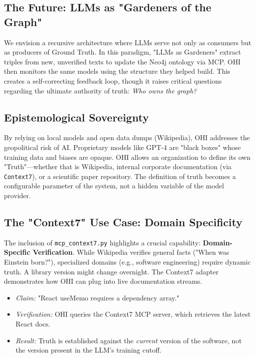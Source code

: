 \documentclass[10pt, a4paper, twocolumn]{article}
\begin{document}
\subsection{The Future: LLMs as "Gardeners of the Graph"}
We envision a recursive architecture where LLMs serve not only as consumers but as producers of Ground Truth. In this paradigm, "LLMs as Gardeners" extract triples from new, unverified texts to update the Neo4j ontology via MCP. OHI then monitors the same models using the structure they helped build. This creates a self-correcting feedback loop, though it raises critical questions regarding the ultimate authority of truth: \textit{Who owns the graph?}

\subsection{Epistemological Sovereignty}
By relying on local models and open data dumps (Wikipedia), OHI addresses the geopolitical risk of AI. Proprietary models like GPT-4 are "black boxes" whose training data and biases are opaque. OHI allows an organization to define its own "Truth"—whether that is Wikipedia, internal corporate documentation (via \texttt{Context7}), or a scientific paper repository. The definition of truth becomes a configurable parameter of the system, not a hidden variable of the model provider.

\subsection{The "Context7" Use Case: Domain Specificity}
The inclusion of \texttt{mcp\_context7.py} highlights a crucial capability: \textbf{Domain-Specific Verification}.
While Wikipedia verifies general facts ("When was Einstein born?"), specialized domains (e.g., software engineering) require dynamic truth. A library version might change overnight. The Context7 adapter demonstrates how OHI can plug into live documentation streams.
\begin{itemize}
    \item \textit{Claim:} "React useMemo requires a dependency array."
    \item \textit{Verification:} OHI queries the Context7 MCP server, which retrieves the latest React docs.
    \item \textit{Result:} Truth is established against the \textit{current} version of the software, not the version present in the LLM's training cutoff.
\end{itemize}
\end{document}
